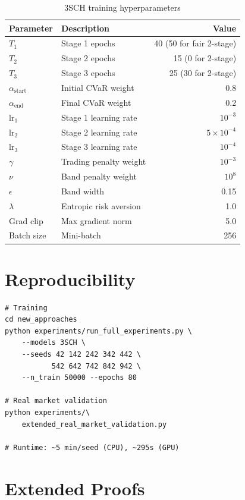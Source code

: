 \documentclass[11pt]{article}
\begin{document}
\begin{table}[h]
\centering
\caption{3SCH training hyperparameters}
\small
\begin{tabular}{llr}
\toprule
\textbf{Parameter} & \textbf{Description} & \textbf{Value} \\
\midrule
$T_1$ & Stage 1 epochs & 40 (50 for fair 2-stage) \\
$T_2$ & Stage 2 epochs & 15 (0 for 2-stage) \\
$T_3$ & Stage 3 epochs & 25 (30 for 2-stage) \\
$\alpha_{\text{start}}$ & Initial CVaR weight & 0.8 \\
$\alpha_{\text{end}}$ & Final CVaR weight & 0.2 \\
lr$_1$ & Stage 1 learning rate & $10^{-3}$ \\
lr$_2$ & Stage 2 learning rate & $5 \times 10^{-4}$ \\
lr$_3$ & Stage 3 learning rate & $10^{-4}$ \\
$\gamma$ & Trading penalty weight & $10^{-3}$ \\
$\nu$ & Band penalty weight & $10^{8}$ \\
$\epsilon$ & Band width & 0.15 \\
$\lambda$ & Entropic risk aversion & 1.0 \\
Grad clip & Max gradient norm & 5.0 \\
Batch size & Mini-batch & 256 \\
\bottomrule
\end{tabular}
\end{table}

\section{Reproducibility}

\begin{verbatim}
# Training
cd new_approaches
python experiments/run_full_experiments.py \
    --models 3SCH \
    --seeds 42 142 242 342 442 \
           542 642 742 842 942 \
    --n_train 50000 --epochs 80

# Real market validation
python experiments/\
    extended_real_market_validation.py

# Runtime: ~5 min/seed (CPU), ~295s (GPU)
\end{verbatim}

\section{Extended Proofs}
\label{app:proofs}
\end{document}
